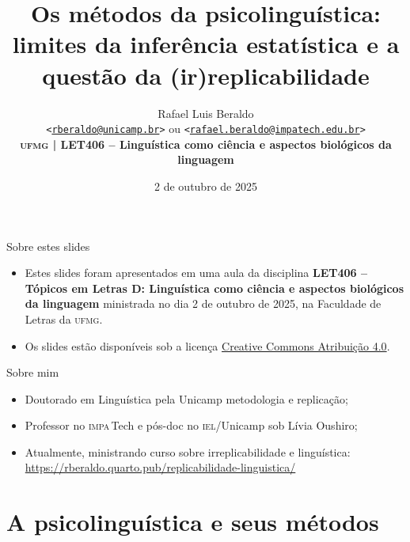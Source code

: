 \documentclass[numbering=fraction,aspectratio=169]{beamer}
\title{Os métodos da psicolinguística: limites da inferência estatística e a questão da (ir)replicabilidade}
\author[Rafael Beraldo]{Rafael Luis Beraldo\\
  {\small
    \texttt{<\href{mailto:rberaldo@unicamp.br}{rberaldo@unicamp.br}>} ou
    \texttt{<\href{mailto:rafael.beraldo@impatech.edu.br}{rafael.beraldo@impatech.edu.br}>}
  }\\[1ex]
  \textbf{\textsc{ufmg} | LET406 -- Linguística como ciência e aspectos biológicos da linguagem}}
\institute{\IEL/Unicamp e \IMPATech}
\date{2 de outubro de 2025}
\newcommand\IEL{\textsc{iel}\xspace}
\newcommand\IMPATech{\textsc{impa}\,Tech\xspace}
\def \LicencaURL{https://creativecommons.org/licenses/by-sa/4.0/}
\def \DisciplinaURL{https://rberaldo.quarto.pub/replicabilidade-linguistica/}
\begin{document}
\frenchspacing


\begin{frame}[plain]{}
  \titlepage
\end{frame}



\begin{frame}{Sobre estes slides}
  \begin{itemize}
  \item Estes slides foram apresentados em uma aula da disciplina \textbf{LET406 -- Tópicos em Letras D: Linguística como ciência e aspectos biológicos da linguagem} ministrada no dia 2 de outubro de 2025, na Faculdade de Letras da \textsc{ufmg}.
  \item Os slides estão disponíveis sob a licença \href{\LicencaURL}{Creative Commons Atribuição 4.0}.
  \end{itemize}
\end{frame}

\begin{frame}{Sobre mim}
  \begin{itemize}
  \item Doutorado em Linguística pela Unicamp metodologia e replicação;
  \item Professor no \IMPATech e pós-doc no \IEL/Unicamp sob Lívia Oushiro;
  \item Atualmente, ministrando curso sobre irreplicabilidade e linguística: \url{\DisciplinaURL}
  \end{itemize}
\end{frame}



\section{A psicolinguística e seus métodos}
\end{document}
